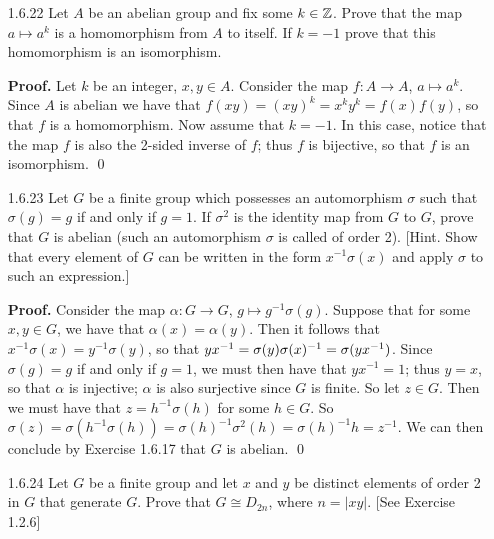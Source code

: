\begin{enumerate}
      \textbf{Proof.} Let $k$ be a nonzero rational number. Consider the map
      $f : \Q \rightarrow \Q$, $q \mapsto kq$. Let $x, y \in Q$. We have that
      $f(x + y) = k(x + y) = kx + ky = f(x) + f(y)$, so that $f$ is a 
      homomorphism. Now suppose $f(x) = f(y)$, so that $kx = ky$. Since
      $k \neq 0$, we shall multiply the equality $kx = ky$ by $1/k$ to get
      $x = y$; i.e, $f$ is injective. Since $f(x/k) = x$, it follows that $f$ is
      onto, so that $f$ is an automorphism of $\Q$. \qed
   \item[1.6.22]  Let $A$ be an abelian group and fix some $k \in \mathbb{Z}$. Prove
                  that the map $a \mapsto a^k$ is a homomorphism from $A$ to 
                  itself. If $k = -1$ prove that this homomorphism is an
                  isomorphism.

      \textbf{Proof.} Let $k$ be an integer, $x, y \in A$. Consider the map
      $f : A \rightarrow A$, $a \mapsto a^k$. Since $A$ is abelian we have that
      $f(xy) = (xy)^k = x^ky^k = f(x)f(y)$, so that $f$ is a homomorphism. Now 
      assume that $k = -1$. In this case, notice that the map $f$ is also the
      2-sided inverse of $f$; thus $f$ is bijective, so that $f$ is an 
      isomorphism. \qed
   \item[1.6.23]  Let $G$ be a finite group which possesses an automorphism
                  $\sigma$ such that $\sigma(g) = g$ if and only if $g = 1$. If
                  $\sigma^2$ is the identity map from $G$ to $G$, prove that $G$
                  is abelian (such an automorphism $\sigma$ is called
                   of order 2). [Hint. Show that every
                  element of $G$ can be written in the form $x^{-1}\sigma(x)$
                  and apply $\sigma$ to such an expression.]

      \textbf{Proof.} Consider the map $\alpha : G \rightarrow G$,
      $g \mapsto g^{-1}\sigma(g)$. Suppose that for some $x, y \in G$, we have
      that $\alpha(x) = \alpha(y)$. Then it follows that
      $x^{-1}\sigma(x) = y^{-1}\sigma(y)$, so that
      $yx^{-1} =\nobreak \sigma(y)\sigma(x)^{-1} = \sigma(yx^{-1})$. Since
      $\sigma(g) = g$ if and only if $g = 1$, we must then have that
      $yx^{-1} = 1$; thus $y = x$, so that $\alpha$ is injective; $\alpha$ is
      also surjective since $G$ is finite. So let $z \in G$. Then we must have 
      that $z = h^{-1}\sigma(h)$ for some $h \in G$. So
      $\sigma(z) = \sigma(h^{-1}\sigma(h)) = \sigma(h)^{-1}\sigma^2(h) =
       \sigma(h)^{-1}h = z^{-1}$. We can then conclude by Exercise 1.6.17 that
      $G$ is abelian. \qed
   \item[1.6.24]  Let $G$ be a finite group and let $x$ and $y$ be distinct
                  elements of order 2 in $G$ that generate $G$. Prove that
                  $G \cong D_{2n}$, where $n = |xy|$. [See Exercise 1.2.6]
                  

\end{enumerate}
